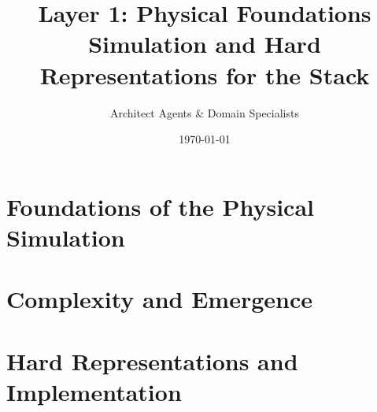 \documentclass[11pt,oneside]{book}
\title{
    \Huge \textbf{Layer 1: Physical Foundations} \\
    \vspace{0.5cm}
    \Large Simulation and Hard Representations for the Stack
}
\author{Architect Agents \& Domain Specialists}
\date{\today}
\begin{document}
\frontmatter
\hypersetup{pageanchor=false}
\maketitle
\hypersetup{pageanchor=true}
\tableofcontents

\mainmatter
\part{Foundations of the Physical Simulation}




\part{Complexity and Emergence}



\part{Hard Representations and Implementation}








\backmatter
\cleardoublepage
{}
{}


\end{document}
